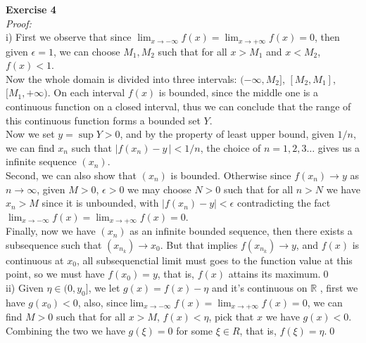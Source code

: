 \documentclass[12pt]{article}
\begin{document}
{\bf Exercise 4}\\
{\it Proof:}\\
i) First we observe that since $\displaystyle\lim_{x\to-\infty}f(x)=\displaystyle\lim_{x\to+\infty}f(x)=0$, then given $\epsilon=1$, we can choose $M_1,M_2$ such that for all $x>M_1$ and $x<M_2$, $f(x)<1$.\\
Now the whole domain is divided into three intervals: $(-\infty,M_2]$, $[M_2,M_1]$, $[M_1,+\infty)$. On each interval $f(x)$ is bounded, since the middle one is a continuous function on a closed interval, thus we can  conclude that the range of this continuous function forms a bounded set $Y$. \\
Now we set $y=\sup{Y}>0$, and by the property of least upper bound, given $1/n$, we can find $x_n$ such that $|f(x_n)-y\,|<1/n$, the choice of $n=1,2,3\ldots$ gives us a infinite sequence $(x_n)$.\\
Second, we can also show that $(x_n)$ is bounded. Otherwise since $f(x_n)\to y$ as $n\to\infty$, given $M>0$, $\epsilon>0$ we may choose $N>0$ such that for all $n>N$ we have $x_n>M$ since it is unbounded, with $|f(x_n)-y|<\epsilon$ contradicting the fact  $\displaystyle\lim_{x\to-\infty}f(x)=\displaystyle\lim_{x\to+\infty}f(x)=0$.\\
Finally, now we have $(x_n)$ as an infinite bounded sequence, then there exists a subsequence such that $(x_{n_k})\to x_0$. But that implies $f(x_{n_k})\to y$, and $f(x)$ is continuous at $x_0$, all subsequenctial limit must goes to the function value at this point, so we must have $f(x_0)=y$, that is, $f(x)$ attains its maximum.\qed\\
ii) Given $\eta\in(0,y_0]$, we let $g(x)=f(x)-\eta$ and it's continuous on $\mathbb{R}$ , first we have $g(x_0)<0$, also, since$\displaystyle\lim_{x\to-\infty}f(x)=\displaystyle\lim_{x\to+\infty}f(x)=0$,
we can find $M>0$ such that for all $x>M$, $f(x)<\eta$, pick that $x$ we have $g(x)<0$. Combining the two we have $g(\xi)=0$ for some $\xi\in R$, that is, $f(\xi)=\eta$.\qed\\
\end{document}
